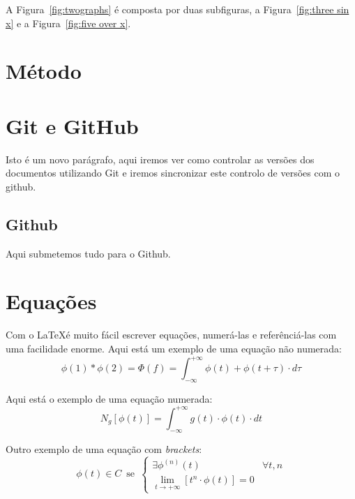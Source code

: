 \documentclass[11pt, a4paper]{article}
\begin{document}
    A Figura~\ref{fig:twographs} é composta por duas subfiguras, a Figura~\ref{fig:three sin x} e a Figura~\ref{fig:five over x}.

    \section{Método}\label{sec:metodo}

    \lipsum[6-7]

    \section{Git e GitHub}\label{sec:outrometodo}

    Isto é um novo parágrafo, aqui iremos ver como controlar as versões dos documentos utilizando Git e iremos sincronizar este controlo de versões com o github.

    \subsection{Github}\label{subsec:github}

    Aqui submetemos tudo para o Github.

    \section{Equações}

    Com o \LaTeX é muito fácil escrever equações, numerá-las e referênciá-las com uma facilidade enorme.
    Aqui está um exemplo de uma equação não numerada:
    \[
        \phi(1) * \phi(2) = \Phi(f) = \int_{-\infty}^{+\infty}  \phi(t) + \phi(t+\tau) \cdot d\tau
    \]

    Aqui está o exemplo de uma equação numerada:
    \begin{equation}\label{eq:num-dist}
        N_g[\phi(t)] = \int_{-\infty}^{+\infty} g(t) \cdot \phi(t) \cdot dt
    \end{equation}

    Outro exemplo de uma equação com \emph{brackets}:
    \begin{equation}\label{eq:classe-c}
        \phi(t) \in C \, \text{ se } \,
        \begin{cases}
            \exists \phi^{(n)} (t) & \forall t,n \\
            \lim_{t \rightarrow +\infty} \left[t^n \cdot \phi(t)\right] = 0
        \end{cases}
    \end{equation}
%    
%    
\end{document}
